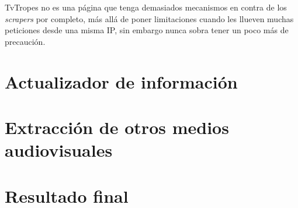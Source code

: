 TvTropes no es una página que tenga demasiados mecanismos en contra de los
\textit{scrapers} por completo, más allá de poner limitaciones cuando les
llueven muchas peticiones desde una misma IP, sin embargo nunca sobra tener un
poco más de precaución. 

\section{Actualizador de información}
\section{Extracción de otros medios audiovisuales}
\section{Resultado final}
